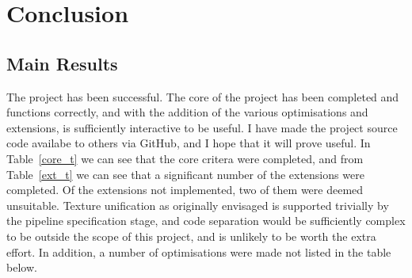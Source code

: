 \documentclass[12pt,twoside,notitlepage]{report}
\begin{document}
\cleardoublepage
\chapter{Conclusion}

\section{Main Results}
The project has been successful. The core of the project has been completed and functions correctly, and with the addition of the various optimisations and extensions, is sufficiently interactive to be useful. I have made the project source code availabe to others via GitHub, and I hope that it will prove useful. In Table~\ref{core_t} we can see that the core critera were completed, and from Table~\ref{ext_t} we can see that a significant number of the extensions were completed. Of the extensions not implemented, two of them were deemed unsuitable. Texture unification as originally envisaged is supported trivially by the pipeline specification stage, and code separation would be sufficiently complex to be outside the scope of this project, and is unlikely to be worth the extra effort. In addition, a number of optimisations were made not listed in the table below.
\end{document}
